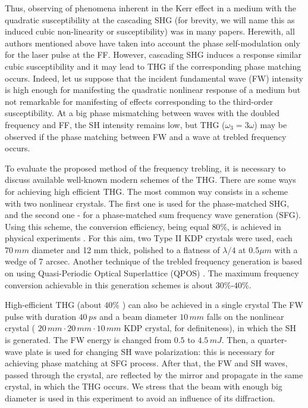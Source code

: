 \documentclass[a4paper, 12pt, onecolumn]{extarticle}
\begin{document}
Thus, observing of phenomena inherent in  the Kerr effect in a medium with the quadratic susceptibility at the cascading SHG (for brevity, we will name this as induced cubic non-linearity or susceptibility) was in many papers. Herewith, all authors mentioned above have taken into account the phase self-modulation only for the laser pulse at the FF. However, cascading SHG induces a response similar cubic susceptibility and it may  lead to THG if the corresponding phase matching occurs. Indeed, let us suppose that the incident fundamental wave (FW) intensity is high enough for manifesting the quadratic nonlinear response of a medium but not remarkable for manifesting of effects corresponding to the third-order susceptibility. At a big phase mismatching between waves with the doubled frequency and FF, the SH intensity remains low, but  THG (\(\omega_3=3\omega\)) may be observed if the phase matching between FW and a wave at trebled frequency occurs.

To evaluate the proposed method of the frequency trebling, it is necessary to discuss available  well-known modern schemes of the THG. There are some ways for achieving  high efficient THG. The most common way consists in a scheme with two nonlinear crystals. The first one is used for the phase-matched SHG, and the second one -  for a phase-matched sum frequency wave generation (SFG).  Using this scheme, the conversion efficiency, being equal $80\%$,  is achieved in physical experiments  \cite{bib:t4a,bib:t4}. For this aim, two Type II KDP crystals were used, each $70\, mm$ diameter and 12 mm thick, polished to a flatness of
$\lambda/4$ at $0.5\mu m$ with a wedge of 7 arcsec.  Another technique of the trebled frequency  generation is based on using Quasi-Periodic Optical Superlattice (QPOS) \cite{bib:t2}.   The maximum frequency conversion achievable in this generation schemes is about $30\%$-$40\%$.

High-efficient THG (about $40\%$ ) can also be achieved in a single crystal \cite{bib:t3}  The FW pulse with duration  $40\,ps$ and a beam  diameter $10\,mm$ falls on the nonlinear crystal ( $20\,mm \cdot 20\,mm \cdot 10\,mm $ KDP crystal, for definiteness), in which the SH is generated. The FW  energy is changed  from $0.5$ to $4.5\,mJ$. Then, a quarter-wave plate is used for changing SH wave polarization: this is necessary for achieving  phase matching at SFG process. After that, the  FW and SH waves, passed through the crystal,  are reflected by the mirror and propagate in the same crystal, in which the THG occurs.  We stress that the beam with enough big diameter is used in this experiment to avoid an influence of its diffraction.  
\end{document}
